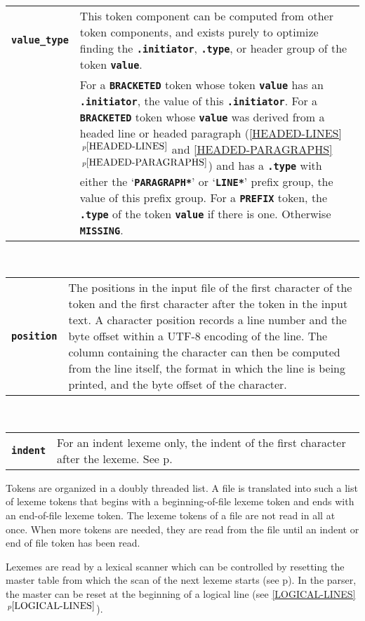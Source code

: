 \documentclass[12pt]{article}
\makeatletter
\newcommand{\TT}[1]{{\tt \bfseries #1}}
\newcommand{\ttmkey}[2]{\TT{#1}\index{#1@\TT{#1}!#2}}
\newcommand{\itemref}[1]{\ref{#1}$\,^{p\pageref{#1}}$}
\newcommand{\pagref}[1]{p\pageref{#1}}
\newenvironment{indpar}[1][0.3in]%
	{\begin{list}{}%
		     {\setlength{\itemsep}{0in}%
		      \setlength{\topsep}{0in}%
		      \setlength{\parsep}{1ex}%
		      \setlength{\labelwidth}{#1}%
		      \setlength{\leftmargin}{#1}%
		      \addtolength{\leftmargin}{\labelsep}}%
	 \item}%
	{\end{list}}
\makeatother
\begin{document}
\begin{indpar}
\begin{tabular}{p{1in}p{4.5in}}
\end{tabular}
\\[1ex]
\begin{tabular}{p{1in}p{4.5in}}
\ttmkey{value\_type}{of token}
		& This token component can be computed from other
		  token components, and exists purely to optimize finding
		  the \TT{.initiator}, \TT{.type}, or header group
		  of the token \TT{value}.
\\[1ex]
		& For a \TT{BRACKETED} token whose
		  token \TT{value} has an \TT{.ini\-tiator},
		  the value of this \TT{.initiator}.  For a
		  \TT{BRACKETED} token whose \TT{value} was derived
		  from a headed line or headed paragraph
		  (\itemref{HEADED-LINES} and \itemref{HEADED-PARAGRAPHS})
		  and has a \TT{.type}
		  with either the `\TT{*PARAGRAPH*}' or `\TT{*LINE*}'
		  prefix group, the value of this prefix group.
		  For a \TT{PREFIX} token, the \TT{.type} of the token
		  \TT{value} if there is one.  Otherwise \TT{MISSING}.
\end{tabular}
\\[1ex]
\begin{tabular}{p{1in}p{4.5in}}
\ttmkey{position}{of token}
		& The positions in the input file of
                  the first character of the token
		  and the first character after the token in the
		  input text.  A character position records a line number
		  and the byte offset within a UTF-8 encoding
		  of the line.  The column containing the character
		  can then be computed from the line itself, the format
		  in which the line is being printed, and the
		  byte offset of the character.
\end{tabular}
\\[1ex]
\begin{tabular}{p{1in}p{4.5in}}
\ttmkey{indent}{of token}
	        & For an indent lexeme only,
		  the indent of the first character after the lexeme.  See
		  \pagref{INDENT-OF-CHARACTER}.
\end{tabular}
\end{indpar}

Tokens are organized in a doubly threaded list.  A file is translated into
such a list of lexeme tokens that begins with a beginning-of-file lexeme token
and ends with an end-of-file lexeme token.
The lexeme tokens of a file are not read in all at once.  When more tokens
are needed, they are read from the file until an indent or end of file
token has been read.

Lexemes are read by a lexical scanner which can be controlled by
resetting the master table from which the scan of the next lexeme
starts (see \pagref{MASTER-TABLE}).  In the parser, the master
can be reset at the beginning of a logical line (see \itemref{LOGICAL-LINES}).
\end{document}
